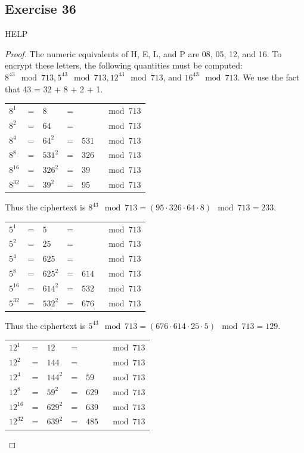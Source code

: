 \documentclass[14pt]{extarticle}
\begin{document}
\subsection{Exercise 36}
HELP
\begin{proof}
The numeric equivalents of H, E, L, and P are 08, 05, 12, and 16. To encrypt these letters, the following quantities 
must be computed: \(8^{43} \mod 713, 5^{43} \mod 713, 12^{43} \mod 713\), and \(16^{43} \mod 713\). We use the 
fact that 43 = 32 + 8 + 2 + 1.

\begin{tabular}{lclcll}
\(8^1\)&=&\(8\)&=&\(\)&\(\mod 713\) \\
\(8^2\)&=&\(64\)&=&\(\)&\(\mod 713\) \\
\(8^4\)&=&\(64^2\)&=&\(531\)&\(\mod 713\) \\
\(8^8\)&=&\(531^2\)&=&\(326\)&\(\mod 713\) \\
\(8^{16}\)&=&\(326^2\)&=&\(39\)&\(\mod 713\) \\
\(8^{32}\)&=&\(39^2\)&=&\(95\)&\(\mod 713\) 
\end{tabular}

Thus the ciphertext is \(8^{43} \mod 713 = (95 \cdot 326 \cdot 64 \cdot 8) \mod 713 = 233\).

\begin{tabular}{lclcll}
\(5^1\)&=&\(5\)&=&\(\)&\(\mod 713\) \\
\(5^2\)&=&\(25\)&=&\(\)&\(\mod 713\) \\
\(5^4\)&=&\(625\)&=&\(\)&\(\mod 713\) \\
\(5^8\)&=&\(625^2\)&=&\(614\)&\(\mod 713\) \\
\(5^{16}\)&=&\(614^2\)&=&\(532\)&\(\mod 713\) \\
\(5^{32}\)&=&\(532^2\)&=&\(676\)&\(\mod 713\) 
\end{tabular}

Thus the ciphertext is \(5^{43} \mod 713 = (676 \cdot 614 \cdot 25 \cdot 5) \mod 713 = 129\).

\begin{tabular}{lclcll}
\(12^1\)&=&\(12\)&=&\(\)&\(\mod 713\) \\
\(12^2\)&=&\(144\)&=&\(\)&\(\mod 713\) \\
\(12^4\)&=&\(144^2\)&=&\(59\)&\(\mod 713\) \\
\(12^8\)&=&\(59^2\)&=&\(629\)&\(\mod 713\) \\
\(12^{16}\)&=&\(629^2\)&=&\(639\)&\(\mod 713\) \\
\(12^{32}\)&=&\(639^2\)&=&\(485\)&\(\mod 713\) 
\end{tabular}


\end{proof}
\end{document}
